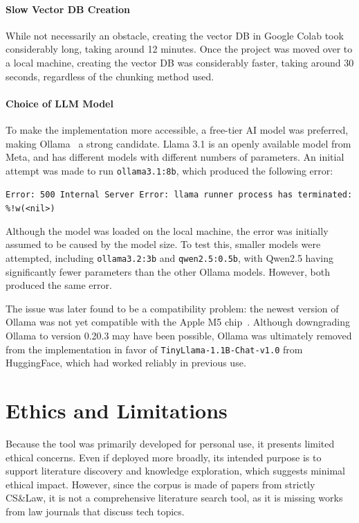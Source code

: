 \documentclass{article}
\begin{document}
\paragraph{Slow Vector DB Creation}
While not necessarily an obstacle, creating the vector DB in Google Colab took considerably long, taking around 12 minutes. 
Once the project was moved over to a local machine, creating the vector DB was considerably faster, taking around 30 seconds, regardless of the chunking method used. 
\paragraph{Choice of LLM Model}
To make the implementation more accessible, a free-tier AI model was preferred, making Ollama~\cite{ollama_llama31} a strong candidate.
Llama 3.1 is an openly available model from Meta, and has different models with different numbers of parameters. 
An initial attempt was made to run \texttt{ollama3.1:8b}, which produced the following error:
\begin{center}
    \texttt{Error: 500 Internal Server Error: llama runner process has terminated: \%!w(<nil>)}
\end{center}
Although the model was loaded on the local machine, the error was initially assumed to be caused by the model size. 
To test this, smaller models were attempted, including \texttt{ollama3.2:3b} and \texttt{qwen2.5:0.5b}, with Qwen2.5 having significantly fewer parameters than the other Ollama models. 
However, both produced the same error.

The issue was later found to be a compatibility problem: the newest version of Ollama was not yet compatible with the Apple M5 chip~\cite{ollama_issue_15448}. 
Although downgrading Ollama to version 0.20.3 may have been possible, Ollama was ultimately removed from the implementation in favor of \texttt{TinyLlama-1.1B-Chat-v1.0} from HuggingFace, which had worked reliably in previous use.

\section{Ethics and Limitations}
Because the tool was primarily developed for personal use, it presents limited ethical concerns. 
Even if deployed more broadly, its intended purpose is to support literature discovery and knowledge exploration, which suggests minimal ethical impact.
However, since the corpus is made of papers from strictly CS\&Law, it is not a comprehensive literature search tool, as it is missing works from law journals that discuss tech topics. 
\end{document}
